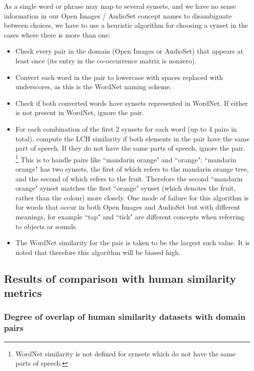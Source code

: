 As a single word or phrase may map to several synsets, and we have no sense information in our Open Images / AudioSet concept names to disambiguate between choices, we have to use a heuristic algorithm for choosing a synset in the cases where there is more than one:

\begin{itemize}
    \item Check every pair in the domain (Open Images or AudioSet) that appears at least once (its entry in the co-occurrence matrix is nonzero). 
    \item Convert each word in the pair to lowercase with spaces replaced with underscores, as this is the WordNet naming scheme.
    \item Check if both converted words have synsets represented in WordNet. If either is not present in WordNet, ignore the pair.
    \item For each combination of the first 2 synsets for each word (up to 4 pairs in total), compute the LCH similarity if both elements in the pair have the same part of speech. If they do not have the same parts of speech, ignore the pair. \footnote{WordNet similarity is not defined for synsets which do not have the same parts of speech. } This is to handle pairs like ``mandarin orange" and ``orange"; ``mandarin orange" has two synsets, the first of which refers to the mandarin orange tree, and the second of which refers to the fruit. Therefore the second ``mandarin orange" synset matches the first ``orange" synset (which denotes the fruit, rather than the colour) more closely. One mode of failure for this algorithm is for words that occur in both Open Images and AudioSet but with different meanings, for example ``tap" and ``tick" are different concepts when referring to objects or sounds. 
    \item The WordNet similarity for the pair is taken to be the largest such value. It is noted that therefore this algorithm will be biased high.
\end{itemize}


\newpage

\subsection{Results of comparison with human similarity metrics}

\subsubsection{Degree of overlap of human similarity datasets with domain pairs}


